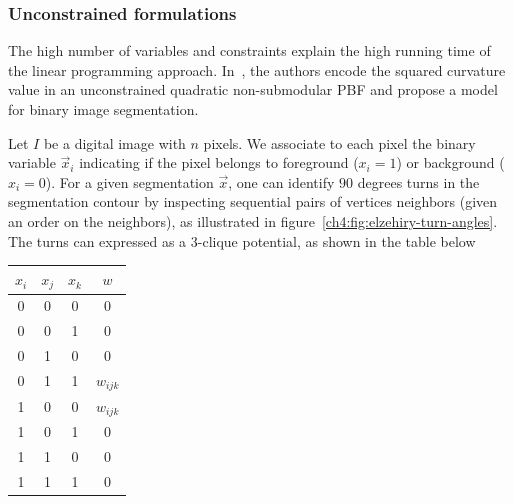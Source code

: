 \subsubsection{Unconstrained formulations}

The high number of variables and constraints explain the high running time of the linear programming approach. In~\cite{zehiry10fast}, the authors encode the squared curvature value in an unconstrained quadratic non-submodular PBF and propose a model for binary image segmentation.

Let $I$ be a digital image with $n$ pixels. We associate to each pixel the binary variable $\vec{x}_i$ indicating if the pixel belongs to foreground ($x_i=1$) or background ($x_i=0$). For a given segmentation $\vec{x}$, one can identify $90$ degrees turns in the segmentation contour by inspecting sequential pairs of vertices neighbors (given an order on the neighbors), as illustrated in figure~\cref{ch4:fig:elzehiry-turn-angles}. The turns can expressed as a $3$-clique potential, as shown in the table below

\begin{center}
\begin{tabular}{|c|c|c|c|}
\hline
$x_i$ & $x_j$ & $x_k$ & $w$ \\
\hline 
0 & 0 & 0 & 0 \\
0 & 0 & 1 & 0 \\
0 & 1 & 0 & 0 \\
0 & 1 & 1 & $w_{ijk}$ \\
1 & 0 & 0 & $w_{ijk}$ \\
1 & 0 & 1 & 0 \\
1 & 1 & 0 & 0 \\
1 & 1 & 1 & 0 \\
\hline 
\end{tabular}
\end{center}

